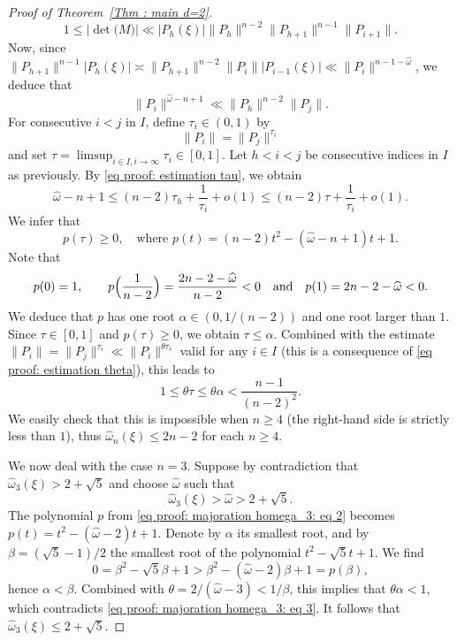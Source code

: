 \documentclass[10pt,a4paper]{amsart}
\numberwithin{equation}{section}
\newcommand\homega{\widehat{\omega}}\newcommand\HH{\mathcal{H}}
\newcommand{\normH}[1]{\|#1\|}
\newcommand\AND{\quad\text{and}\quad}
\theoremstyle{definition}
\theoremstyle{plain}
\begin{document}
\begin{proof}[Proof of Theorem~\ref{Thm : main d=2}]
\begin{equation*}
1 \leq \big|\det\big(M)\big| \ll |P_{h}(\xi)|\normH{P_{h}}^{n-2}\normH{P_{h+1}}^{n-1}\normH{P_{i+1}}.
\end{equation*}
Now, since $\normH{P_{h+1}}^{n-1}|P_{h}(\xi)| \asymp \normH{P_{h+1}}^{n-2}\normH{P_i}|P_{i-1}(\xi)| \ll \normH{P_i}^{n-1-\homega}$, we deduce that
\begin{equation}
\label{eq proof: estimation tau}
\normH{P_i}^{\homega-n+1} \ll \normH{P_{h}}^{n-2}\normH{P_{j}}.
\end{equation}
For consecutive $i<j$ in $I$, define $\tau_i\in(0,1)$ by
\[
\normH{P_i} = \normH{P_j}^{\tau_i}
\]
and set $\tau = \limsup_{i\in I, i\to\infty} \tau_i \in [0,1]$. Let $h<i<j$ be consecutive indices in $I$ as previously. By \eqref{eq proof: estimation tau}, we obtain
\[
\homega-n+1 \leq (n-2)\tau_h + \frac{1}{\tau_i} +o(1) \leq (n-2)\tau + \frac{1}{\tau_i} +o(1).
\]
We infer that
\begin{equation}
\label{eq proof: majoration homega_3: eq 2}
p(\tau) \geq 0, \quad \textrm{where } p(t) = (n-2)t^2-(\homega-n+1)t+1.
\end{equation}
Note that
\begin{equation*}
p(0) = 1, \qquad p\Bigl(\frac{1}{n-2}\Bigr) = \frac{2n-2-\homega}{n-2} < 0 \AND p(1) = 2n-2-\homega < 0.
\end{equation*}
We deduce that $p$ has one root $\alpha\in(0,1/(n-2))$ and one root larger than $1$. Since $\tau\in[0,1]$ and $p(\tau)\geq 0$, we obtain $\tau \leq \alpha$. Combined with the estimate $\normH{P_i} = \normH{P_j}^{\tau_i} \ll \normH{P_i}^{\theta\tau_i}$ valid
for any $i\in I$ (this is a consequence of \eqref{eq proof: estimation theta}), this leads to
\begin{equation}
\label{eq proof: majoration homega_3: eq 3}
1 \leq \theta\tau \leq \theta\alpha < \frac{n-1}{(n-2)^2}.
\end{equation}
We easily check that this is impossible when $n\geq 4$ (the right-hand side is strictly less than $1$), thus $\homega_n(\xi)\leq 2n-2$ for each $n\geq 4$.

We now deal with the case $n=3$. Suppose by contradiction that $\homega_3(\xi) > 2+\sqrt 5$ and choose $\homega$ such that
\[
\homega_3(\xi) > \homega > 2+\sqrt 5.
\]
The polynomial $p$ from \eqref{eq proof: majoration homega_3: eq 2} becomes $p(t) = t^2-(\homega-2)t+1$. Denote by $\alpha$ its smallest root, and by $\beta = (\sqrt 5 -1)/2$ the smallest root of the polynomial $t^2-\sqrt 5 t + 1$. We find
\begin{equation*}
0 = \beta^2-\sqrt 5 \beta + 1 > \beta^2-(\homega-2 )\beta + 1 = p(\beta),
\end{equation*}
hence $\alpha < \beta$. Combined with $\theta = 2/(\homega-3) < 1/\beta$, this implies that $\theta \alpha < 1$, which contradicts \eqref{eq proof: majoration homega_3: eq 3}. It follows that $\homega_3(\xi) \leq 2+\sqrt 5$.
\end{proof}
\end{document}
